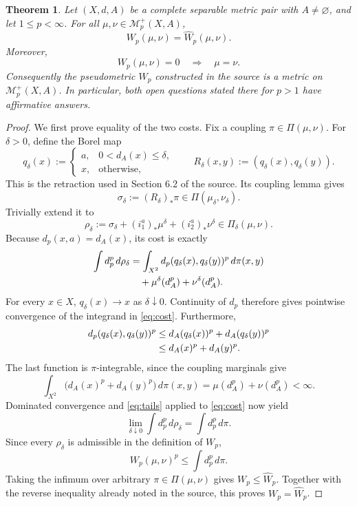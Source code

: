 \documentclass[11pt]{article}
\newtheorem{theorem}{Theorem}
\newcommand{\M}{\mathcal M}
\newcommand{\PiD}{\Pi_{\delta}}
\newcommand{\dd}{\,d}
\begin{document}
\begin{theorem}\label{thm:main}
Let $(X,d,A)$ be a complete separable metric pair with $A\neq\varnothing$,
and let $1\leq p<\infty$.  For all
$\mu,\nu\in\M_p^+(X,A)$,
\[
             W_p(\mu,\nu)=\widehat W_p(\mu,\nu).
\]
Moreover,
\[
             W_p(\mu,\nu)=0\quad\Longrightarrow\quad\mu=\nu.
\]
Consequently the pseudometric $W_p$ constructed in the source is a metric on
$\M_p^+(X,A)$.  In particular, both open questions stated there for $p>1$
have affirmative answers.
\end{theorem}

\begin{proof}
We first prove equality of the two costs.  Fix a coupling
$\pi\in\Pi(\mu,\nu)$.  For $\delta>0$, define the Borel map
\[
 q_\delta(x):=
 \begin{cases}
   a,&0<d_A(x)\leq\delta,\\
   x,&\text{otherwise},
 \end{cases}
 \qquad R_\delta(x,y):=(q_\delta(x),q_\delta(y)).
\]
This is the retraction used in Section 6.2 of the source.  Its coupling lemma
gives
\[
       \sigma_\delta:=(R_\delta)_*\pi
       \in\Pi(\mu_\delta,\nu_\delta).
\]
Trivially extend it to
\[
 \rho_\delta:=\sigma_\delta
       +(i_1^a)_*\mu^\delta+(i_2^a)_*\nu^\delta
       \in\PiD(\mu,\nu).
\]
Because $d_p(x,a)=d_A(x)$, its cost is exactly
\begin{align}
 \int d_p^p\dd\rho_\delta
 &=\int_{X^2}d_p(q_\delta(x),q_\delta(y))^p\dd\pi(x,y) \notag\\
 &\quad+\mu^\delta(d_A^p)+\nu^\delta(d_A^p). \label{eq:cost}
\end{align}
For every $x\in X$, $q_\delta(x)\to x$ as $\delta\downarrow0$.
Continuity of $d_p$ therefore gives pointwise convergence of the integrand
in \eqref{eq:cost}.  Furthermore,
\begin{align}
 d_p(q_\delta(x),q_\delta(y))^p
 &\leq d_A(q_\delta(x))^p+d_A(q_\delta(y))^p \notag\\
 &\leq d_A(x)^p+d_A(y)^p. \label{eq:dominator}
\end{align}
The last function is $\pi$-integrable, since the coupling marginals give
\begin{equation}
 \int_{X^2}\bigl(d_A(x)^p+d_A(y)^p\bigr)\dd\pi(x,y)
   =\mu(d_A^p)+\nu(d_A^p)<\infty. \label{eq:moments}
\end{equation}
Dominated convergence and \eqref{eq:tails} applied to \eqref{eq:cost} now yield
\[
       \lim_{\delta\downarrow0}\int d_p^p\dd\rho_\delta
       =\int d_p^p\dd\pi.
\]
Since every $\rho_\delta$ is admissible in the definition of $W_p$,
\[
       W_p(\mu,\nu)^p\leq\int d_p^p\dd\pi.
\]
Taking the infimum over arbitrary $\pi\in\Pi(\mu,\nu)$ gives
$W_p\leq\widehat W_p$.  Together with the reverse inequality already
noted in the source, this proves $W_p=\widehat W_p$.


\end{proof}
\end{document}
